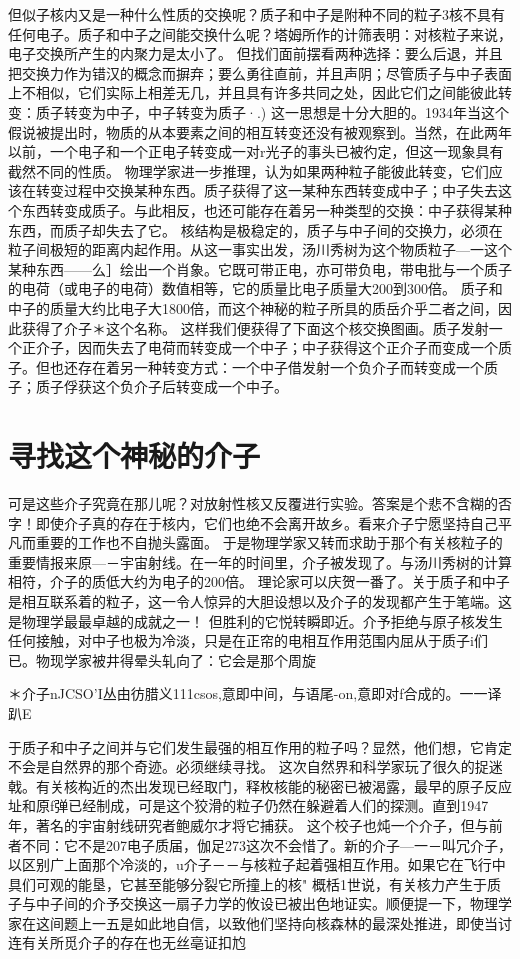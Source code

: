 但似子核内又是一种什么性质的交换呢？质子和中子是附种不同的粒子3核不具有任何电子。质子和中子之间能交换什么呢？塔姆所作的计筛表明：对核粒子来说，电子交换所产生的内聚力是太小了。
但找们面前摆看两种选择：要么后退，并且把交换力作为错汉的概念而摒弃；要么勇往直前，并且声阴；尽管质子与中子表面上不相似，它们实际上相差无几，并且具有许多共同之处，因此它们之间能彼此转变：质子转变为中子，中子转变为质子·.)
这一思想是十分大胆的。1934年当这个假说被提出时，物质的从本要素之间的相互转变还没有被观察到。当然，在此两年以前，一个电子和一个正电子转变成一对r光子的事头已被彴定，但这一现象具有截然不同的性质。
物理学家进一步推理，认为如果两种粒子能彼此转变，它们应该在转变过程中交换某种东西。质子获得了这一某种东西转变成中子；中子失去这个东西转变成质子。与此相反，也还可能存在着另一种类型的交换：中子获得某种东西，而质子却失去了它。
核结构是极稳定的，质子与中子间的交换力，必须在粒子间极短的距离内起作用。从这一事实出发，汤川秀树为这个物质粒子—一这个某种东西——么］绘出一个肖象。它既可带正电，亦可带负电，带电批与一个质子的电荷（或电子的电荷）数值相等，它的质量比电子质量大200到300倍。
质子和中子的质量大约比电子大1800倍，而这个神秘的粒子所具的质岳介乎二者之间，因此获得了介子＊这个名称。
这样我们便获得了下面这个核交换图画。质子发射一个正介子，因而失去了电荷而转变成一个中子；中子获得这个正介子而变成一个质子。但也还存在着另一种转变方式：一个中子借发射一个负介子而转变成一个质子；质子俘获这个负介子后转变成一个中子。

\section{寻找这个神秘的介子}

可是这些介子究竟在那儿呢？对放射性核又反覆进行实验。答案是个悲不含糊的否字！即使介子真的存在于核内，它们也绝不会离开故乡。看来介子宁愿坚持自己平凡而重要的工作也不自抛头露面。
于是物理学家又转而求助于那个有关核粒子的重要情报来原—－宇宙射线。在一年的时间里，介子被发现了。与汤川秀树的计算相符，介子的质低大约为电子的200倍。
理论家可以庆贺一番了。关于质子和中子是相互联系着的粒子，这一令人惊异的大胆设想以及介子的发现都产生于笔端。这是物理学最最卓越的成就之一！
但胜利的它悦转瞬即近。介予拒绝与原子核发生任何接触，对中子也极为冷淡，只是在正帘的电相互作用范围内屈从于质子i们已。物现学家被井得晕头轧向了：它会是那个周旋

＊介子nJCSO'I丛由彷腊义111csos,意即中间，与语尾-on,意即对f合成的。一一译趴E

于质子和中子之间并与它们发生最强的相互作用的粒子吗？显然，他们想，它肯定不会是自然界的那个奇迹。必须继续寻找。
这次自然界和科学家玩了很久的捉迷戟。有关核构近的杰出发现已经取门，释枚核能的秘密已被渴露，最早的原子反应址和原f弹已经制成，可是这个狡滑的粒子仍然在躲避着人们的探测。直到1947年，著名的宇宙射线研究者鲍威尔才将它捕获。
这个校子也炖一个介子，但与前者不同：它不是207电子质届，伽足273这次不会惜了。新的介子—一－叫冗介子，以区别广上面那个冷淡的，u介子－－与核粒子起着强相互作用。如果它在飞行中具们可观的能垦，它甚至能够分裂它所撞上的核"
概栝1世说，有关核力产生于质子与中子间的介予交换这一扇子力学的攸设已被出色地证实。顺便提一下，物理学家在这间题上一五是如此地自信，以致他们坚持向核森林的最深处推进，即使当讨连有关所觅介子的存在也无丝亳证扣尥

